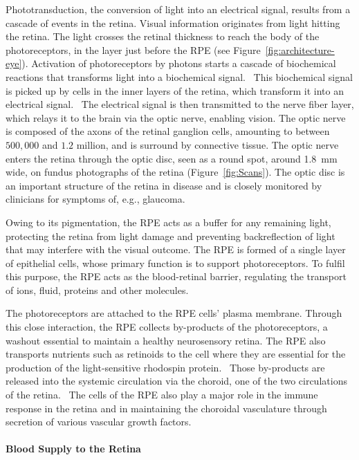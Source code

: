\documentclass[12pt,a4paper]{journal}
\begin{document}
Phototransduction, the conversion of light into an electrical signal, results from a cascade of events in the retina. 
Visual information originates from light hitting the retina.
The light crosses the retinal thickness to reach the body of the photoreceptors, in the layer just before the RPE (see Figure~\ref{fig:architecture-eye}).
Activation of photoreceptors by photons starts a cascade of biochemical reactions that transforms light into a biochemical signal.~\cite{Hurley_2009}
This biochemical signal is picked up by cells in the inner layers of the retina, which transform it into an electrical signal.~\cite{Arslan_2018}
The electrical signal is then transmitted to the nerve fiber layer, which relays it to the brain via the optic nerve, enabling vision.
The optic nerve is composed of the axons of the retinal ganglion cells, amounting to between $500,000$ and $1.2$ million, and is surround by connective tissue\cite{Salazar_2019}.
The optic nerve enters the retina through the optic disc, seen as a round spot, around \SI{1.8}{\mm} wide, on fundus photographs of the retina (Figure~\ref{fig:Scans}).
The optic disc is an important structure of the retina in disease and is closely monitored by clinicians for symptoms of, e.g., glaucoma.

Owing to its pigmentation, the RPE acts as a buffer for any remaining light, protecting the retina from light damage and preventing backreflection of light that may interfere with the visual outcome.
The RPE is formed of a single layer of epithelial cells, whose primary function is to support photoreceptors.
To fulfil this purpose, the RPE acts as the blood-retinal barrier, regulating the transport of ions, fluid, proteins and other molecules.~\cite{Boulton_2001}

The photoreceptors are attached to the RPE cells' plasma membrane.
Through this close interaction, the RPE collects by-products of the photoreceptors, a washout essential to maintain a healthy neurosensory retina.
The RPE also transports nutrients such as retinoids to the cell where they are essential for the production of the light-sensitive rhodospin protein.~\cite{Boulton_2001} 
Those by-products are released into the systemic circulation via the choroid, one of the two circulations of the retina.~\cite{Boulton_2001}
The cells of the RPE also play a major role in the immune response in the retina and in maintaining the choroidal vasculature through secretion of various vascular growth factors.~\cite{Boulton_2001,Detrick_2020} 

\paragraph*{Blood Supply to the Retina}
\end{document}
